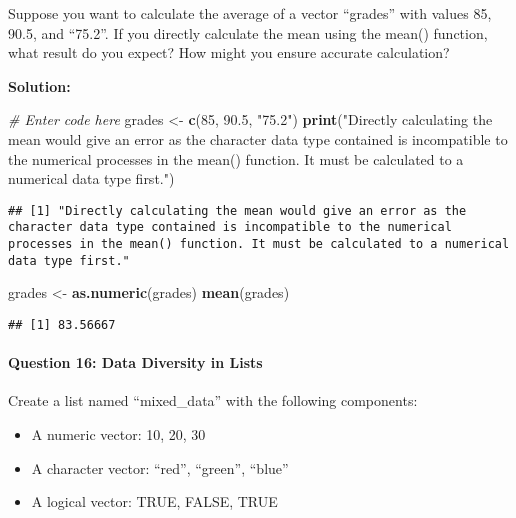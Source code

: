 \documentclass[
]{article}
\newenvironment{Shaded}{\begin{snugshade}}{\end{snugshade}}
\newcommand{\CommentTok}[1]{\textcolor[rgb]{0.56,0.35,0.01}{\textit{#1}}}
\newcommand{\DecValTok}[1]{\textcolor[rgb]{0.00,0.00,0.81}{#1}}
\newcommand{\FloatTok}[1]{\textcolor[rgb]{0.00,0.00,0.81}{#1}}
\newcommand{\FunctionTok}[1]{\textcolor[rgb]{0.13,0.29,0.53}{\textbf{#1}}}
\newcommand{\NormalTok}[1]{#1}
\newcommand{\OtherTok}[1]{\textcolor[rgb]{0.56,0.35,0.01}{#1}}
\newcommand{\StringTok}[1]{\textcolor[rgb]{0.31,0.60,0.02}{#1}}
\begin{document}
Suppose you want to calculate the average of a vector ``grades'' with
values 85, 90.5, and ``75.2''. If you directly calculate the mean using
the mean() function, what result do you expect? How might you ensure
accurate calculation?

\textbf{Solution:}

\begin{Shaded}
\begin{Highlighting}[]
\CommentTok{\# Enter code here}
\NormalTok{grades }\OtherTok{\textless{}{-}} \FunctionTok{c}\NormalTok{(}\DecValTok{85}\NormalTok{, }\FloatTok{90.5}\NormalTok{, }\StringTok{"75.2"}\NormalTok{)}
\FunctionTok{print}\NormalTok{(}\StringTok{"Directly calculating the mean would give an error as the character data type contained is incompatible to the numerical processes in the mean() function. It must be calculated to a numerical data type first."}\NormalTok{)}
\end{Highlighting}
\end{Shaded}

\begin{verbatim}
## [1] "Directly calculating the mean would give an error as the character data type contained is incompatible to the numerical processes in the mean() function. It must be calculated to a numerical data type first."
\end{verbatim}

\begin{Shaded}
\begin{Highlighting}[]
\NormalTok{grades }\OtherTok{\textless{}{-}} \FunctionTok{as.numeric}\NormalTok{(grades)}
\FunctionTok{mean}\NormalTok{(grades)}
\end{Highlighting}
\end{Shaded}

\begin{verbatim}
## [1] 83.56667
\end{verbatim}

\hypertarget{question-16-data-diversity-in-lists}{%
\paragraph{Question 16: Data Diversity in
Lists}\label{question-16-data-diversity-in-lists}}

Create a list named ``mixed\_data'' with the following components:

\begin{itemize}
\item
  A numeric vector: 10, 20, 30
\item
  A character vector: ``red'', ``green'', ``blue''
\item
  A logical vector: TRUE, FALSE, TRUE
\end{itemize}
\end{document}
